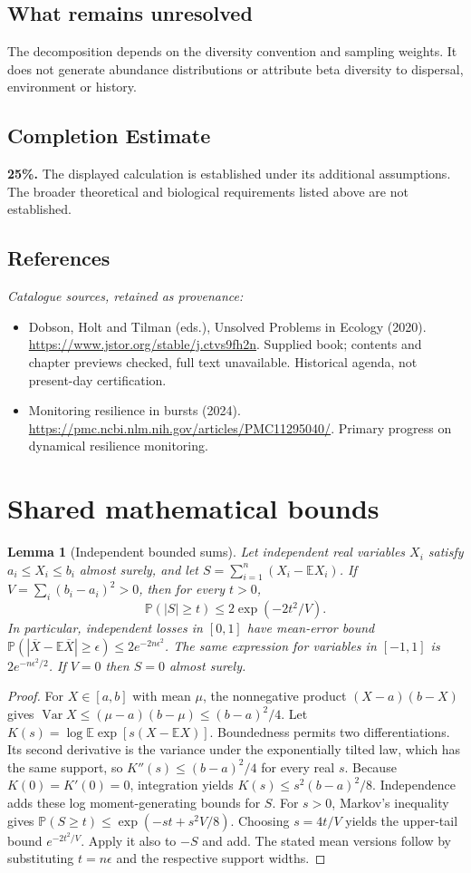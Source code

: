 \documentclass[11pt]{article}
\newcommand{\E}{\mathbb E}
\newcommand{\Prob}{\mathbb P}
\DeclareMathOperator{\Var}{Var}
\providecommand{\E}{\mathbb E}
\providecommand{\Prob}{\mathbb P}
\providecommand{\Var}{\operatorname{Var}}
\newtheorem{sharedlemma}{Lemma}[section]
\begin{document}
\subsection{What remains unresolved}
The decomposition depends on the diversity convention and sampling weights. It does not generate abundance distributions or attribute beta diversity to dispersal, environment or history.
\subsection{Completion Estimate}
\textbf{25\%.} The displayed calculation is established under its additional assumptions. The broader theoretical and biological requirements listed above are not established.
\subsection{References}
\noindent\emph{Catalogue sources, retained as provenance:}
\begin{itemize}
\item Dobson, Holt and Tilman (eds.), Unsolved Problems in Ecology (2020). \url{https://www.jstor.org/stable/j.ctvs9fh2n}. Supplied book; contents and chapter previews checked, full text unavailable. Historical agenda, not present-day certification.
\item Monitoring resilience in bursts (2024). \url{https://pmc.ncbi.nlm.nih.gov/articles/PMC11295040/}. Primary progress on dynamical resilience monitoring.
\end{itemize}
\clearpage


\appendix
\section{Shared mathematical bounds}\label{app:bounds}
\begin{sharedlemma}[Independent bounded sums]\label{lem:bounded}
Let independent real variables $X_i$ satisfy $a_i\leq X_i\leq b_i$ almost surely,
and let $S=\sum_{i=1}^n(X_i-\E X_i)$. If
$V=\sum_i(b_i-a_i)^2>0$, then for every $t>0$,
\[
 \Prob(|S|\geq t)\leq 2\exp(-2t^2/V).
\]
In particular, independent losses in $[0,1]$ have mean-error bound
$\Prob(|\overline X-\E\overline X|\geq\epsilon)
\leq2e^{-2n\epsilon^2}$. The same expression for variables in $[-1,1]$
is $2e^{-n\epsilon^2/2}$. If $V=0$ then $S=0$ almost surely.
\end{sharedlemma}
\begin{proof}
For $X\in[a,b]$ with mean $\mu$, the nonnegative product
$(X-a)(b-X)$ gives
$\Var X\leq(\mu-a)(b-\mu)\leq(b-a)^2/4$.
Let $K(s)=\log\E\exp[s(X-\E X)]$.
Boundedness permits two differentiations. Its second derivative is the variance
under the exponentially tilted law, which has the same support, so
$K''(s)\leq(b-a)^2/4$ for every real $s$.
Because $K(0)=K'(0)=0$, integration yields
$K(s)\leq s^2(b-a)^2/8$.
Independence adds these log moment-generating bounds for $S$.
For $s>0$, Markov's inequality gives
$\Prob(S\geq t)\leq\exp(-st+s^2V/8)$.
Choosing $s=4t/V$ yields the upper-tail bound $e^{-2t^2/V}$.
Apply it also to $-S$ and add. The stated mean versions follow by substituting
$t=n\epsilon$ and the respective support widths.
\end{proof}
\end{document}
